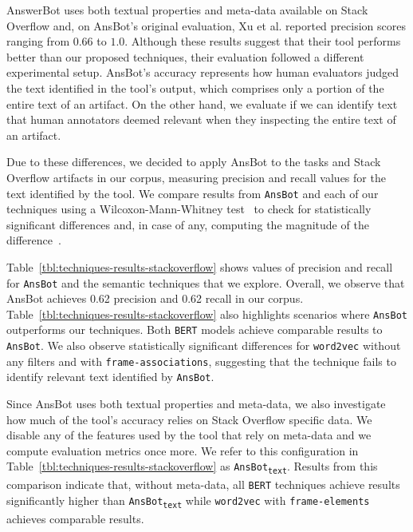AnswerBot uses both textual properties and meta-data available on Stack Overflow and, 
on \acs{AnsBot}'s original evaluation, Xu et al. reported precision scores ranging from $0.66$ to $1.0$. 
Although these results suggest that their tool performs better than our proposed techniques, their evaluation followed a different experimental setup. 
\acs{AnsBot}'s accuracy represents how 
 human evaluators judged the text identified in the tool's output, which comprises only a portion of the entire text of an artifact. On the other hand, 
we evaluate if we can identify text that human annotators deemed relevant when they inspecting the entire text of an artifact.



Due to these differences, we decided to apply \acs{AnsBot} to the tasks and Stack Overflow artifacts in our corpus, measuring precision and recall values for the text identified by the tool. 
We compare results from \texttt{AnsBot} and each of our techniques using
a Wilcoxon-Mann-Whitney test~\cite{mannWhitneyU} to check for statistically significant differences
and, in case of any, computing the magnitude of the difference~\cite{cohen2013statistical}. 



Table~\ref{tbl:techniques-results-stackoverflow} shows values of precision and recall for  \texttt{AnsBot} and the semantic techniques that we explore. 
Overall, we observe that \acs{AnsBot} achieves 0.62 precision and 0.62 recall in our corpus.
Table~\ref{tbl:techniques-results-stackoverflow} also highlights scenarios where \texttt{AnsBot} outperforms our techniques.
Both \texttt{BERT} models achieve comparable results to \texttt{AnsBot}.
We also observe statistically significant differences for 
\texttt{word2vec} without any filters and with \texttt{frame-associations}, suggesting that the technique
fails to identify relevant text identified by \texttt{AnsBot}.






Since \acs{AnsBot} uses both textual properties and meta-data, 
we also investigate how much of the tool's accuracy relies on Stack Overflow specific data.
We disable any of the features used by the tool that rely on meta-data and we compute evaluation metrics once more.
We refer to this configuration in Table~\ref{tbl:techniques-results-stackoverflow} as \texttt{AnsBot\textsubscript{text}}.
Results from this comparison indicate that, without meta-data, all \texttt{BERT} techniques
achieve results 
significantly higher than  \texttt{AnsBot\textsubscript{text}}
while \texttt{word2vec} with \texttt{frame-elements} achieves comparable results.


